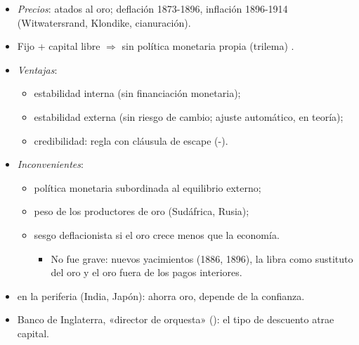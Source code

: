 \documentclass{article}
\begin{document}
\begin{columnas}
\begin{itemize}
  \begin{itemize}
  \item Déficit $\to$ sale oro $\to M\downarrow\to P\downarrow\to$ competitividad $\uparrow\to$ déficit se cierra; al revés en el superavitario.
  \item Teoría cuantitativa: $MV\equiv PY$ es identidad; teoría con $V$ estable y pleno empleo.
  \end{itemize}
\item \emph{Precios}: atados al oro; deflación 1873-1896, inflación 1896-1914 (Witwatersrand, Klondike, cianuración).
\end{itemize}
\begin{itemize}
\item Fijo + capital libre $\Rightarrow$ sin política monetaria propia (trilema) .
\item \emph{Ventajas}:
  \begin{itemize}
  \item estabilidad interna (sin financiación monetaria);
  \item estabilidad externa (sin riesgo de cambio; ajuste automático, en teoría);
  \item credibilidad: regla con cláusula de escape (-).
  \end{itemize}
\item \emph{Inconvenientes}:
  \begin{itemize}
  \item política monetaria subordinada al equilibrio externo;
  \item peso de los productores de oro (Sudáfrica, Rusia);
  \item sesgo deflacionista si el oro crece menos que la economía.
    \begin{itemize}
    \item No fue grave: nuevos yacimientos (1886, 1896), la libra como sustituto del oro y el oro fuera de los pagos interiores.
    \end{itemize}
  \end{itemize}
\end{itemize}
\begin{itemize}
\item {} en la periferia (India, Japón): ahorra oro, depende de la confianza.
\item Banco de Inglaterra, «director de orquesta» (): el tipo de descuento atrae capital.

\end{itemize}
\end{columnas}
\end{document}
